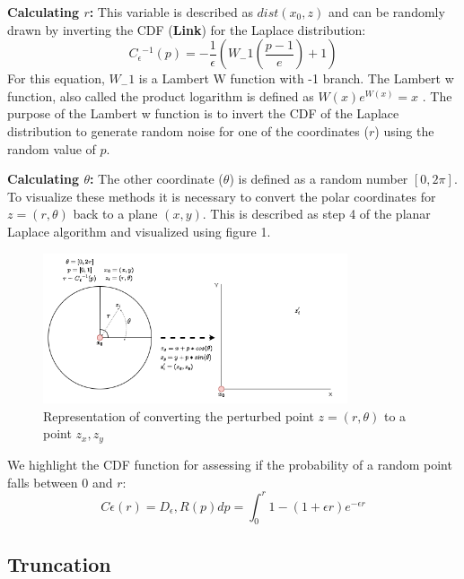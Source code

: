 \textbf{Calculating $r$:}
This variable is described as $dist(x_0, z)$ and can be randomly drawn by inverting the CDF (\textbf{Link}) for the Laplace distribution:
\begin{equation}
  C{_\epsilon}{^{-1}}(p) = - \frac{1}{\epsilon}(W_-1 (\frac{p - 1}{e}) + 1)
\end{equation}
For this equation, $W_-1$ is a Lambert W function with -1 branch.
The Lambert w function, also called the product logarithm is defined as $W(x)e^{W(x)} = x$ \citep{lehtonen_lambert_2016}.
The purpose of the Lambert w function is to invert the CDF of the Laplace distribution to generate random noise for one of the coordinates ($r$) using the random value of $p$.

\textbf{Calculating $\theta$:}
The other coordinate ($\theta$) is defined as a random number $[0, 2\pi]$. \newline \newline
To visualize these methods it is necessary to convert the polar coordinates for $z = (r, \theta)$ back to a plane $(x, y)$.
This is described as step 4 of the planar Laplace algorithm \citep{DBLP:journals/corr/abs-1212-1984} and visualized using figure 1.
\begin{figure}[h]
  \includegraphics[width=0.8\textwidth]{TheorethicalFramework/ND-Laplace/Images/polar-laplace-to-planar.png}
  \centering
  \caption{Representation of converting the perturbed point $z = (r, \theta)$ to a point ${z_x, z_y}$}
\end{figure}

We highlight the CDF function  for assessing if the probability of a random point falls between 0 and $r$:
\begin{equation}
  C{\epsilon}(r) = D_\epsilon,R(p)dp = \int_{0}^{r} 1 - (1 + \epsilon r ) e^{-\epsilon r}
\end{equation}

\newpage
\subsection{Truncation}
